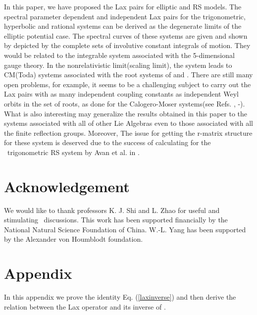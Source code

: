 \documentclass[a4paper,12pt]{article}
\renewcommand{\theequation}{\thesection.\arabic{equation}}
\begin{document}
\setcounter{equation}{0} \label{summ} In this paper, we have proposed the
Lax pairs for elliptic \coordHE{} and \coordHE{} RS models. The
spectral parameter dependent and independent Lax pairs for
the trigonometric, hyperbolic and rational systems can be
derived as the degenerate limits of the elliptic potential
case. The spectral curves of these systems are given and
shown by depicted by the complete sets of involutive
constant integrals of motion.
They would  be related to the
integrable system associated with  the 5-dimensional gauge
theory\cite{n,bm1}. In the
nonrelativistic limit(scaling limit), the system leads to
CM(Toda) systems associated with the root systems of \coordHE{}
and \coordHE{}. There are still
many open problems, for example, it seems to be a
challenging subject to carry out the Lax pairs with as many
independent coupling constants as independent Weyl orbits in
the set of roots, as done for the Calogero-Moser systems(see
Refs. \cite{op}, \cite{bcs}
-\cite{hm}). What is also interesting may generalize the results obtained
in this paper to the systems associated with all of other
Lie Algebras even to those associated with all the finite
reflection groups\cite{bcs1}. Moreover, The issue for
getting the r-matrix structure for these system is deserved
due to the success of calculating for the \ trigonometric
\coordHE{} RS system by Avan et al. in \cite{Avan}.

\section*{Acknowledgement}

We would like to thank professors K. J. Shi and L. Zhao for
useful and stimulating \ discussions. This work has been
supported financially by the National Natural Science
Foundation of China. W.-L. Yang has been supported by the
Alexander von Houmblodt foundation.

\section*{Appendix}

\renewcommand{\theequation}{A.\arabic{equation}}
\setcounter{equation}{0} In
this appendix we prove the identity Eq. (\ref{laxinverse})
and then derive the relation between the Lax operator
\coordHE{} and its inverse of \coordHE{}.
\end{document}
